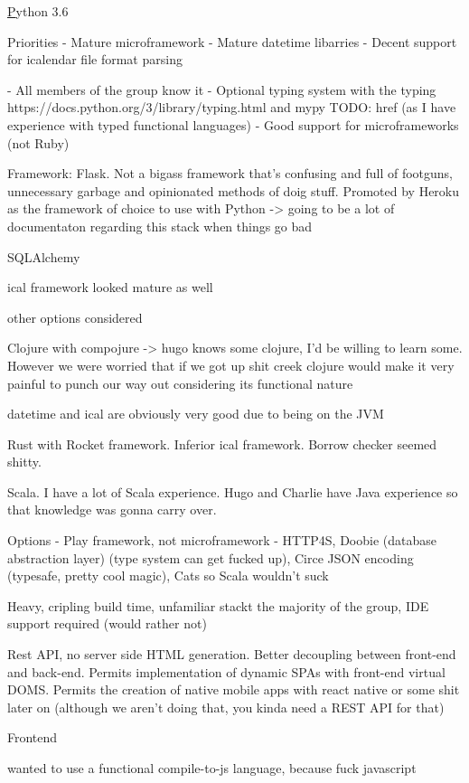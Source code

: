 \documentclass[11pt,a4paper]{report}
\begin{document}
\href{https://www.python.org/}Python 3.6


Priorities
- Mature microframework
- Mature datetime libarries
- Decent support for icalendar file format parsing


- All members of the group know it
- Optional typing system with the typing https://docs.python.org/3/library/typing.html and mypy TODO: href (as I have experience with typed functional languages)
- Good support for microframeworks (not Ruby)

Framework: Flask. Not a bigass framework that's confusing and full of footguns, unnecessary garbage and opinionated methods of doig stuff.
Promoted by Heroku as the framework of choice to use with Python -> going to be a lot of documentaton regarding this stack when things go bad

SQLAlchemy

ical framework looked mature as well

other options considered


Clojure with compojure -> hugo knows some clojure, I'd be willing to learn some. However we were worried that if we got up shit creek clojure would make it very painful to punch our way out considering its functional nature

datetime and ical are obviously very good due to being on the JVM


Rust with Rocket framework. Inferior ical framework. Borrow checker seemed shitty.

Scala. I have a lot of Scala experience. Hugo and Charlie have Java experience so that knowledge was gonna carry over.

Options - Play framework, not microframework
- HTTP4S, Doobie (database abstraction layer) (type system can get fucked up), Circe JSON encoding (typesafe, pretty cool magic), Cats so Scala wouldn't suck

Heavy, cripling build time, unfamiliar stackt the majority of the group, IDE support required (would rather not)




Rest API, no server side HTML generation. Better decoupling between front-end and back-end. Permits implementation of dynamic SPAs with front-end virtual DOMS. Permits the creation of native mobile apps with react native or some shit later on (although we aren't doing that, you kinda need a REST API for that)

Frontend

wanted to use a functional compile-to-js language, because fuck javascript
\end{document}
